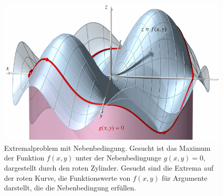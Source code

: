 %
%
%
\begin{figure}
\centering
\includegraphics{chapters/010-fuvar/images/lagrangekurve.pdf}
\caption{Extremalproblem mit Nebenbedingung. 
Gesucht ist das Maximum der Funktion $f(x,y)$ unter der Nebenbedingunge
$g(x,y)=0$, dargestellt durch den roten Zylinder.
Gesucht sind die Extrema auf der roten Kurve, die Funktionswerte von 
$f(x,y)$ für Argumente darstellt, die die Nebenbedingung erfüllen.
\label{buch:fuvar:nebenbedingungen:fig:lagrangekurve}}
\end{figure}
